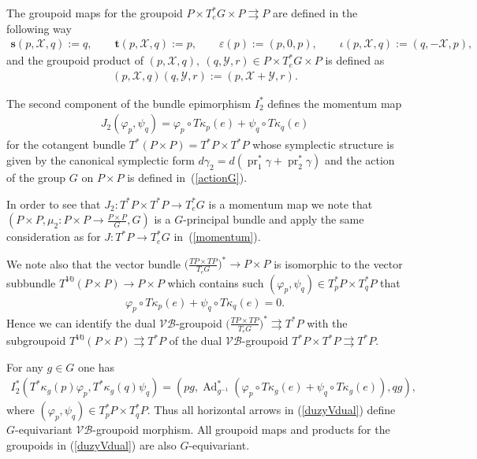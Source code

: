 \documentclass[pdftex]{sigma}
\newcommand{\Ss}{\textbf{s}}
\newcommand{\Tt}{\textbf{t}}
\renewcommand{\to}{\rightarrow}
\newcommand{\tto}{\rightrightarrows}
\DeclareMathOperator{\Ad}{Ad}
\numberwithin{equation}{section}
\begin{document}
The groupoid maps for the groupoid $P\times T_e^*G\times P\tto P$ are def\/ined in the following way
\begin{gather*}
\Ss(p,\mathcal{X},q):=q,\qquad \Tt(p,\mathcal{X},q):=p,\qquad \varepsilon(p):=(p,0,p),\qquad
\iota(p,\mathcal{X},q):=(q,-\mathcal{X},p),
\end{gather*}
and the groupoid product of $(p,\mathcal{X},q),\ (q,\mathcal{Y},r)\in P\times T^*_eG\times P$ is def\/ined as
\begin{gather*}
(p,\mathcal{X},q)(q,\mathcal{Y},r):=(p,\mathcal{X}+\mathcal{Y},r).
\end{gather*}

The second component of the bundle epimorphism $I_2^*$ def\/ines the momentum map
\begin{gather*}%
J_2(\varphi_p,\psi_q)=\varphi_p\circ T\kappa_p(e)+\psi_q\circ T\kappa_q(e)
\end{gather*}
for the cotangent bundle $T^*(P\times P)=T^*P\times T^*P$ whose symplectic structure is given by the canonical symplectic form $d\gamma_2=d(\operatorname{pr}_1^*\gamma+\operatorname{pr}_2^*\gamma)$ and the action of the group $G$ on $P\times P$ is def\/ined in~(\ref{actionG}).

In order to see that $J_2\colon T^*P\times T^*P\to T_e^*G$ is a momentum map we note that $(P\times P,\mu_2\colon P\times P\to \frac{P\times P}{G}, G)$ is a $G$-principal bundle and apply the same consideration as for $J\colon T^*P\to T^*_e G$ in~(\ref{momentum}).

We note also that the vector bundle $\big(\frac{TP\times T P}{T_eG}\big)^*\to P\times P$ is isomorphic to the vector subbundle $T^{V0}(P\times P)\to P\times P$ which contains such $(\varphi_p,\psi_q)\in T^*_pP\times T^*_q P$ that
\begin{gather*} \varphi_p\circ T\kappa_p(e)+\psi_q\circ T\kappa_q(e)=0.\end{gather*}
Hence we can identify the dual $\mathcal{V}\!\mathcal{B}$-groupoid $\big(\frac{TP\times T P}{T_eG}\big)^*\tto T^*P$ with the subgroupoid $T^{V0}(P\times P)\tto T^*P$ of the dual $\mathcal{V}\!\mathcal{B}$-groupoid $T^*P\times T^*P\tto T^*P$.

For any $g\in G$ one has
\begin{gather*} I_2^*(T^*\kappa_g(p)\varphi_p, T^*\kappa_g(q)\psi_q)=(pg, \Ad^*_{g^{-1}}(\varphi_p\circ T\kappa_g(e)+\psi_q\circ T\kappa_g(e)), qg), \end{gather*}
where $(\varphi_p,\psi_q)\in T^*_pP\times T^*_qP$. Thus all horizontal arrows in (\ref{duzyVdual}) def\/ine $G$-equivariant $\mathcal{V}\!\mathcal{B}$-groupoid morphism. All groupoid maps and products for the groupoids in (\ref{duzyVdual}) are also $G$-equivariant.
\end{document}
